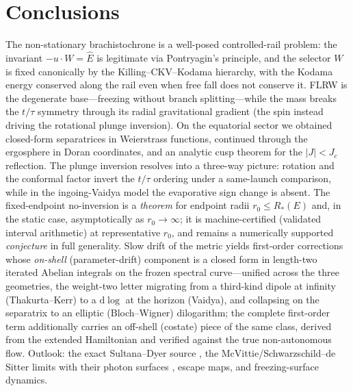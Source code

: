 \documentclass[12pt]{iopart}
\newcommand{\Ehat}{\hat E}
\newcommand{\Jc}{J_{c}}
\newcommand{\dd}{\mathrm{d}}
\begin{document}
\section{Conclusions}
\label{sec:concl}
The non-stationary brachistochrone is a well-posed controlled-rail problem: the
invariant $-u\cdot W=\Ehat$ is legitimate via Pontryagin's principle, and the
selector $W$ is fixed canonically by the Killing--CKV--Kodama hierarchy, with
the Kodama energy conserved along the rail even when free fall does not conserve
it. FLRW is the degenerate base---freezing without branch splitting---while the
mass breaks the $t/\tau$ symmetry through its radial gravitational gradient (the
spin instead driving the rotational plunge inversion). On
the equatorial sector we obtained closed-form separatrices in Weierstrass
functions, continued through the ergosphere in Doran coordinates, and an analytic
cusp theorem for the $|J|<\Jc$ reflection. The plunge inversion resolves into a
three-way picture: rotation and the conformal factor invert the $t/\tau$
ordering under a same-launch comparison, while in the ingoing-Vaidya model the
evaporative sign change is absent. The fixed-endpoint no-inversion is a
\emph{theorem} for endpoint radii $r_0\le R_\ast(E)$ and, in the static case,
asymptotically as $r_0\to\infty$; it is machine-certified (validated interval
arithmetic) at representative $r_0$, and remains a numerically supported
\emph{conjecture} in full generality. Slow drift of the metric yields first-order
corrections whose \emph{on-shell} (parameter-drift) component is a closed form in
length-two iterated Abelian integrals on the frozen spectral curve---unified across
the three geometries, the weight-two letter migrating from a third-kind dipole at
infinity (Thakurta--Kerr) to a $\dd\log$ at the horizon (Vaidya), and collapsing on
the separatrix to an elliptic (Bloch--Wigner) dilogarithm; the complete first-order
term additionally carries an off-shell (costate) piece of the same class, derived
from the extended Hamiltonian and verified against the true non-autonomous flow. Outlook: the
exact Sultana--Dyer source
\cite{SultanaDyer2005}, the McVittie/Schwarzschild--de Sitter limits
\cite{McVittie1933,Kottler1918,Kaloper2010} with their photon surfaces
\cite{ClaudelViracVirbhadra2001}, escape maps, and freezing-surface dynamics.
\end{document}
